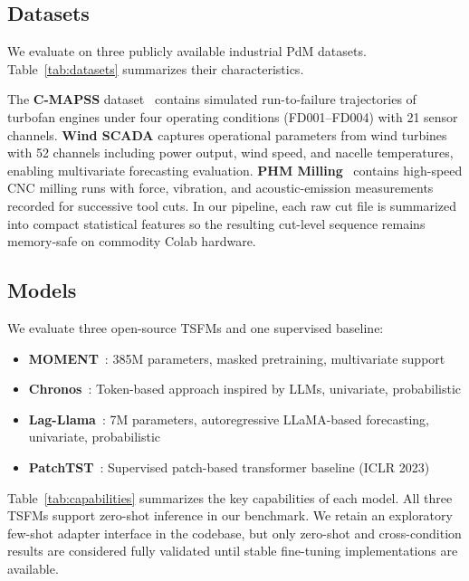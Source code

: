 \subsection{Datasets}

We evaluate on three publicly available industrial PdM datasets. Table~\ref{tab:datasets} summarizes their characteristics.



The \textbf{C-MAPSS} dataset~\cite{saxena2008cmapss} contains simulated run-to-failure trajectories of turbofan engines under four operating conditions (FD001--FD004) with 21 sensor channels. \textbf{Wind SCADA} captures operational parameters from wind turbines with 52 channels including power output, wind speed, and nacelle temperatures, enabling multivariate forecasting evaluation. \textbf{PHM Milling}~\cite{phm2010milling} contains high-speed CNC milling runs with force, vibration, and acoustic-emission measurements recorded for successive tool cuts. In our pipeline, each raw cut file is summarized into compact statistical features so the resulting cut-level sequence remains memory-safe on commodity Colab hardware.

\subsection{Models}

We evaluate three open-source TSFMs and one supervised baseline:
\begin{itemize}
    \item \textbf{MOMENT}~\cite{goswami2024moment}: 385M parameters, masked pretraining, multivariate support
    \item \textbf{Chronos}~\cite{ansari2024chronos}: Token-based approach inspired by LLMs, univariate, probabilistic
    \item \textbf{Lag-Llama}~\cite{lag_llama2023}: 7M parameters, autoregressive LLaMA-based forecasting, univariate, probabilistic
    \item \textbf{PatchTST}~\cite{nie2022patchtst}: Supervised patch-based transformer baseline (ICLR 2023)
\end{itemize}

Table~\ref{tab:capabilities} summarizes the key capabilities of each model. All three TSFMs support zero-shot inference in our benchmark. We retain an exploratory few-shot adapter interface in the codebase, but only zero-shot and cross-condition results are considered fully validated until stable fine-tuning implementations are available.

